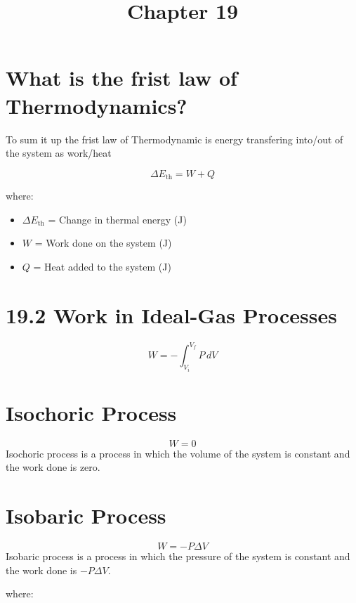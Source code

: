 \documentclass{article}
\begin{document}
\title{Chapter 19}
\author{}
\date{}

\maketitle



\section*{What is the frist law of Thermodynamics?}

To sum it up the frist law of Thermodynamic is energy transfering into/out of the system as work/heat



\begin{equation}
    \Delta E_{\text{th}} = W + Q
\end{equation}

where:
\begin{itemize}
    \item $\Delta E_{\text{th}}$ = Change in thermal energy (J)
    \item $W$ = Work done on the system (J)
    \item $Q$ = Heat added to the system (J)
\end{itemize}


\section*{19.2 Work in Ideal-Gas Processes}

\begin{equation}
    W = - \int_{V_i}^{V_f} P \, dV
\end{equation}

\section*{Isochoric Process}

\begin{equation}
    W = 0
\end{equation}
Isochoric process is a process in which the volume of the system is constant and the work done is zero.


\section*{Isobaric Process}

    \begin{equation}
        W = - P \Delta V
    \end{equation}
    Isobaric process is a process in which the pressure of the system is constant and the work done is $-P \Delta V$.



    
    where:
\end{document}
